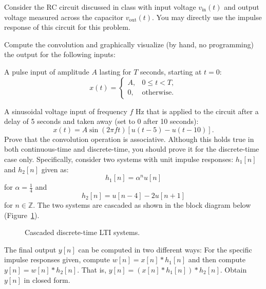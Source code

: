 \documentclass{ee102_pset}
\author{\rule{3cm}{0.4pt}} %
\begin{document}
Consider the RC circuit discussed in class with input voltage $v_{\text{in}}(t)$ and output voltage measured across the capacitor $v_{\text{out}}(t)$. You may directly use the impulse response of this circuit for this problem.

Compute the convolution and graphically visualize (by hand, no programming) the output for the following inputs:

\problempart[20 points] A pulse input of amplitude $A$ lasting for $T$ seconds, starting at $t=0$:
\[
x(t) = \begin{cases}
A, & 0 \le t < T,\\
0, & \text{otherwise.}
\end{cases}
\]

\problempart[20 points] A sinusoidal voltage input of frequency $f$ Hz that is applied to the circuit after a delay of 5 seconds and taken away (set to 0 after 10 seconds):
\[
x(t) = A \sin(2 \pi f t) \left[u(t-5) - u(t-10)\right].
\]
Prove that the convolution operation is associative. Although this holds true in both continuous-time and discrete-time, you should prove it for the discrete-time case only. Specifically, consider two systems with unit impulse responses: $h_1[n]$ and $h_2[n]$ given as:
\[
h_1[n] = \alpha^n u[n]
\]
for $\alpha = \tfrac{1}{4}$ and 
\[
h_2[n] = u[n-4] - 2u[n+1]
\]
for $n \in \mathbb{Z}$. The two systems are cascaded as shown in the block diagram below (Figure~\ref{fig:cascade}). 
\begin{figure}[h]
  \centering
  \caption{Cascaded discrete-time LTI systems.}
  \label{fig:cascade}
\end{figure}

The final output $y[n]$ can be computed in two different ways:
\problempart [15 points] For the specific impulse responses given, compute $w[n] = x[n] * h_1[n]$ and then compute $y[n] = w[n] * h_2[n]$. That is, $y[n] = (x[n] * h_1[n]) * h_2[n]$. Obtain $y[n]$ in closed form.
\end{document}
